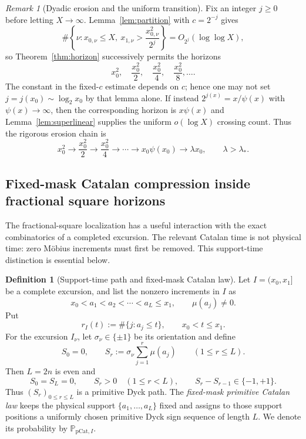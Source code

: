 \documentclass[11pt,reqno]{amsart}
\numberwithin{equation}{section}
\theoremstyle{plain}
\theoremstyle{definition}
\newtheorem{definition}[theorem]{Definition}
\theoremstyle{remark}
\newtheorem{remark}[theorem]{Remark}
\begin{document}
\begin{remark}[Dyadic erosion and the uniform transition]
\label{rem:dyadic-erosion}
Fix an integer $j\ge0$ before letting $X\to\infty$.  Lemma~\ref{lem:partition} with
$c=2^{-j}$ gives
\begin{equation}
\#\left\{\nu:x_{0,\nu}\le X,\ x_{1,\nu}>
\frac{x_{0,\nu}^2}{2^j}\right\}=O_{2^j}(\log\log X),
\end{equation}
so Theorem~\ref{thm:horizon} successively permits the horizons
\begin{equation}
x_0^2,\quad \frac{x_0^2}{2},\quad \frac{x_0^2}{4},\quad
\frac{x_0^2}{8},\ldots.
\end{equation}
The constant in the fixed-$c$ estimate depends on $c$; hence one may not set
$j=j(x_0)\sim\log_2x_0$ by that lemma alone.  If instead
$2^{j(x)}=x/\psi(x)$ with $\psi(x)\to\infty$, then the corresponding
horizon is $x\psi(x)$ and Lemma~\ref{lem:superlinear} supplies the uniform
$o(\log X)$ crossing count.  Thus the rigorous erosion chain is
\begin{equation}
x_0^2\to\frac{x_0^2}{2}\to\frac{x_0^2}{4}\to\cdots
\to x_0\psi(x_0)\to\lambda x_0,\qquad\lambda>\lambda_*.
\end{equation}
\end{remark}

\subsection{Fixed-mask Catalan compression inside fractional square horizons}
\label{subsec:catalan-square}

The fractional-square localization has a useful interaction with the exact
combinatorics of a completed excursion.  The relevant Catalan time is not
physical time: zero M\"obius increments must first be removed.  This
support-time distinction is essential below.

\begin{definition}[Support-time path and fixed-mask Catalan law]
\label{def:support-catalan}
Let $I=(x_0,x_1]$ be a complete excursion, and list the nonzero increments in
$I$ as
\begin{equation}
 x_0<a_1<a_2<\cdots<a_L\le x_1,
 \qquad \mu(a_j)\ne0.
\end{equation}
Put
\begin{equation}
 r_I(t):=\#\{j:a_j\le t\},\qquad x_0<t\le x_1.
\end{equation}
For the excursion $I_\nu$, let $\sigma_\nu\in\{\pm1\}$ be its orientation and define
\begin{equation}
 S_0=0,\qquad
 S_r:=\sigma_\nu\sum_{j=1}^r\mu(a_j)\qquad(1\le r\le L).
\end{equation}
Then $L=2n$ is even and
\begin{equation}
 S_0=S_L=0,\qquad S_r>0\quad(1\le r<L),\qquad
 S_r-S_{r-1}\in\{-1,+1\}.
\end{equation}
Thus $(S_r)_{0\le r\le L}$ is a primitive Dyck path.  The
\emph{fixed-mask primitive Catalan law} keeps the physical support
$\{a_1,\dots,a_L\}$ fixed and assigns to those support positions a uniformly
chosen primitive Dyck sign sequence of length $L$.  We denote its probability
by $\mathbb P_{\mathrm{pCat},I}$.
\end{definition}
\end{document}
